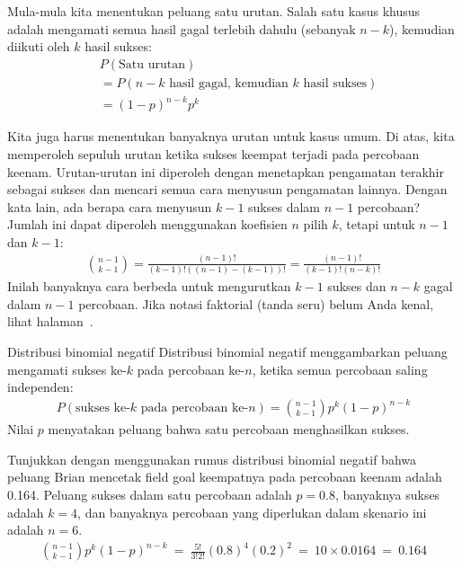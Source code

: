 Mula-mula kita menentukan peluang satu urutan. Salah satu kasus khusus adalah mengamati semua hasil gagal terlebih dahulu (sebanyak $n-k$), kemudian diikuti oleh $k$ hasil sukses:
\begin{align*}
&P(\text{Satu urutan}) \\
&= P(\text{$n-k$ hasil gagal, kemudian $k$ hasil sukses}) \\
&= (1-p)^{n-k} p^{k}
\end{align*}

\D{\newpage}

Kita juga harus menentukan banyaknya urutan untuk kasus umum. Di atas, kita memperoleh sepuluh urutan ketika sukses keempat terjadi pada percobaan keenam. Urutan-urutan ini diperoleh dengan menetapkan pengamatan terakhir sebagai sukses dan mencari semua cara menyusun pengamatan lainnya. Dengan kata lain, ada berapa cara menyusun $k-1$ sukses dalam $n-1$ percobaan? Jumlah ini dapat diperoleh menggunakan koefisien $n$ pilih $k$, tetapi untuk $n-1$ dan $k-1$:
\begin{align*}
{n-1 \choose k-1} = \frac{(n-1)!}{(k-1)! \left((n-1) - (k-1)\right)!} = \frac{(n-1)!}{(k-1)! \left(n - k\right)!}
\end{align*}
Inilah banyaknya cara berbeda untuk mengurutkan $k-1$ sukses dan $n-k$ gagal dalam $n-1$ percobaan. Jika notasi faktorial (tanda seru) belum Anda kenal, lihat halaman~\pageref{factorial_defined}.

\begin{onebox}{Distribusi binomial negatif}
  Distribusi binomial negatif menggambarkan
  peluang mengamati sukses ke-$k$ pada
  percobaan ke-$n$, ketika semua percobaan saling independen:
  \begin{align*}
  P(\text{sukses ke-$k$ pada percobaan ke-$n$})
      = {n-1 \choose k-1} p^{k}(1-p)^{n-k}
  \end{align*}
  Nilai $p$ menyatakan peluang bahwa
  satu percobaan menghasilkan sukses.
\end{onebox}

\begin{examplewrap}
\begin{nexample}{Tunjukkan dengan menggunakan rumus distribusi binomial negatif bahwa peluang Brian mencetak field goal keempatnya pada percobaan keenam adalah 0.164.}
Peluang sukses dalam satu percobaan adalah $p=0.8$, banyaknya sukses adalah $k=4$, dan banyaknya percobaan yang diperlukan dalam skenario ini adalah $n=6$.
\begin{align*}
{n-1 \choose k-1}p^k(1-p)^{n-k}\ 
	=\ \frac{5!}{3!2!} (0.8)^4 (0.2)^2\ 
	=\ 10\times 0.0164\ 
	=\ 0.164
\end{align*}
\end{nexample}
\end{examplewrap}

